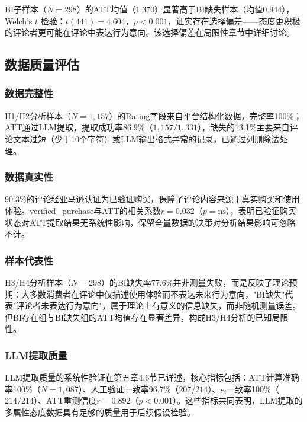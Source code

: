 BI子样本（$N=298$）的ATT均值（1.370）显著高于BI缺失样本（均值0.944），Welch's $t$ 检验：$t(441)=4.604$，$p<0.001$，证实存在选择偏差——态度更积极的评论者更可能在评论中表达行为意向。该选择偏差在局限性章节中详细讨论。

\subsection{数据质量评估}

\subsubsection{数据完整性}

H1/H2分析样本（$N=1{,}157$）的Rating字段来自平台结构化数据，完整率100\%；ATT通过LLM提取，提取成功率86.9\%（$1{,}157/1{,}331$），缺失的13.1\%主要来自评论文本过短（少于10个字符）或LLM输出格式异常的记录，已通过列删除法处理。

\subsubsection{数据真实性}

90.3\%的评论经亚马逊认证为已验证购买，保障了评论内容来源于真实购买和使用体验。verified\_purchase与ATT的相关系数$r=0.032$（$p=\text{ns}$），表明已验证购买状态对ATT提取结果无系统性影响，保留全量数据的决策对分析结果影响可忽略不计。

\subsubsection{样本代表性}

H3/H4分析样本（$N=298$）的BI缺失率77.6\%并非测量失败，而是反映了理论预期：大多数消费者在评论中仅描述使用体验而不表达未来行为意向，"BI缺失"代表"评论者未表达行为意向"，属于理论上有意义的信息缺失，而非随机测量误差。但BI存在组与BI缺失组的ATT均值存在显著差异，构成H3/H4分析的已知局限性。

\subsubsection{LLM提取质量}

LLM提取质量的系统性验证在第五章4.6节已详述，核心指标包括：ATT计算准确率100\%（$N=1{,}087$）、人工验证一致率96.7\%（$207/214$）、$e_i$一致率100\%（$214/214$）、ATT重测信度$r=0.892$（$p<0.001$）。这些指标共同表明，LLM提取的多属性态度数据具有足够的质量用于后续假设检验。
